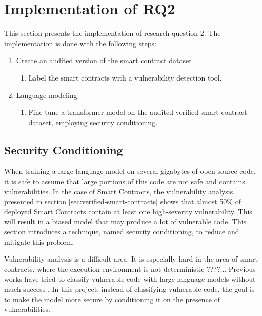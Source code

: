 %

\FloatBarrier

\section{Implementation of RQ2}
This section presents the implementation of research question 2. The implementation is done with the following steps:
\begin{enumerate}
    \item Create an audited version of the smart contract dataset
    \begin{enumerate}
        \item Label the smart contracts with a vulnerability detection tool.
    \end{enumerate}
    \item Language modeling
    \begin{enumerate}
        \item Fine-tune a transformer model on the audited verified smart contract dataset, employing security conditioning.
    \end{enumerate}
\end{enumerate}

\subsection{Security Conditioning}
\label{sec:security-conditioning}
When training a large language model on several gigabytes of open-source code, it is safe to assume that large portions of this code are not safe and contains vulnerabilities. In the case of Smart Contracts, the vulnerability analysis presented in section \ref{sec:verified-smart-contracts} shows that almost 50\% of deployed Smart Contracts contain at least one high-severity vulnerability. This will result in a biased model that may produce a lot of vulnerable code. This section introduces a technique, named security conditioning, to reduce and mitigate this problem.

Vulnerability analysis is a difficult area. It is especially hard in the area of smart contracts, where the execution environment is not deterministic ????... Previous works have tried to classify vulnerable code with large language models without much success . In this project, instead of classifying vulnerable code, the goal is to make the model more secure by conditioning it on the presence of vulnerabilities.

